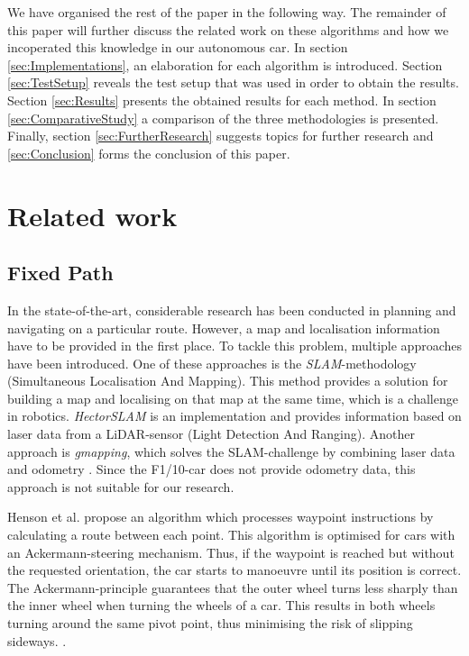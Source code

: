 \documentclass[conference,a4paper]{IEEEtran}
\begin{document}
We have organised the rest of the paper in the following way. The remainder of this paper will further discuss the related work on these algorithms and how we incoperated this knowledge in our autonomous car. In section \ref{sec:Implementations}, an elaboration for each algorithm is introduced. Section \ref{sec:TestSetup} reveals the test setup that was used in order to obtain the results. Section \ref{sec:Results} presents the obtained results for each method. In section \ref{sec:ComparativeStudy} a comparison of the three methodologies is presented. Finally, section \ref{sec:FurtherResearch} suggests topics for further research and \ref{sec:Conclusion} forms the conclusion of this paper.

\section{Related work}
\subsection{Fixed Path}
In the state-of-the-art, considerable research has been conducted in planning and navigating on a particular route. However, a map and localisation information have to be provided in the first place. To tackle this problem, multiple approaches have been introduced. One of these approaches is the \emph{SLAM}-methodology (Simultaneous Localisation And Mapping). This method provides a solution for building a map and localising on that map at the same time, which is a challenge in robotics. \emph{Hector\textunderscore SLAM} is an implementation and provides information based on laser data from a LiDAR-sensor (Light Detection And Ranging)\cite{Kohlbrecher2011, Kohlbrecher2012}. Another approach is \emph{gmapping}, which solves the SLAM-challenge by combining laser data and odometry \cite{Grisetti2007}. Since the F1/10-car does not provide odometry data, this approach is not suitable for our research.

Henson et al. \cite{Henson2008} propose an algorithm which processes waypoint instructions by calculating a route between each point. This algorithm is optimised for cars with an Ackermann-steering mechanism. Thus, if the waypoint is reached but without the requested orientation, the car starts to manoeuvre until its position is correct. The Ackermann-principle guarantees that the outer wheel turns less sharply than the inner wheel when turning the wheels of a car. This results in both wheels turning around the same pivot point, thus minimising the risk of slipping sideways. \cite{King-Hele2002}. 
\end{document}

